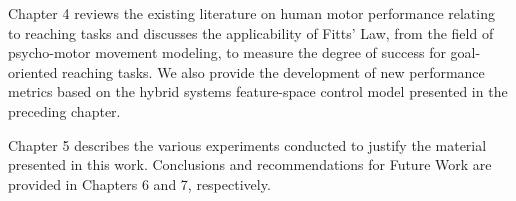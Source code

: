 Chapter 4 reviews the existing literature on human motor performance relating to reaching tasks and discusses the applicability of Fitts' Law, from the field of psycho-motor movement modeling, to measure the degree of success for goal-oriented reaching tasks.  We also provide the development of new performance metrics based on the hybrid systems feature-space control model presented in the preceding chapter.

Chapter 5 describes the various experiments conducted to justify the material presented in this work.
Conclusions and recommendations for Future Work are provided in Chapters 6 and 7, respectively.  